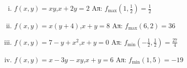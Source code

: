 \documentclass[a4paper,table]{report}
\begin{document}
\begin{enumerate}
    \begin{enumerate}[i)]
      \item $ f(x,y) = xy $,\quad $ x+2y = 2 $ \hfill Απ: 
        $ f_{\text{max}}(1, \frac{1}{2}) = \frac{1}{2}  $

      \item $ f(x,y) = x(y+4) $,\quad $ x+y=8 $ \hfill Απ: 
        $ f_{\text{max}}(6,2) = 36 $

      \item $ f(x,y) = 7-y+x^{2} $,\quad $ x+y=0 $ \hfill Απ: 
        $ f_{\text{min}}(- \frac{1}{2}, \frac{1}{2}) = \frac{27}{4}  $

      \item $ f(x,y) = x - 3y -xy $,\quad $ x+y=6 $ \hfill Απ: 
        $ f_{\text{min}}(1,5) = -19 $
    \end{enumerate}

\end{enumerate}
\end{document}
